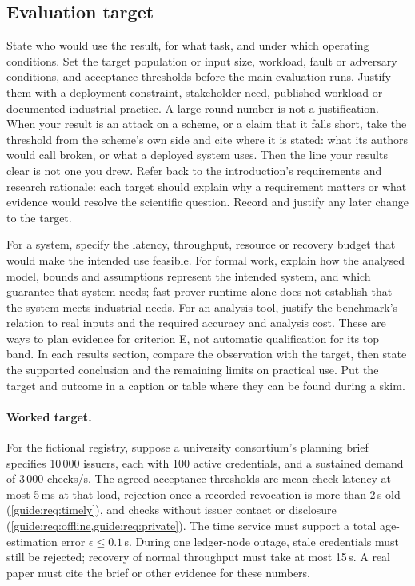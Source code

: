\subsection{Evaluation target}\label{guide:chapters:eval-target}
State who would use the result, for what task, and under which operating conditions. Set the target population or input size, workload, fault or adversary conditions, and acceptance thresholds before the main evaluation runs. Justify them with a deployment constraint, stakeholder need, published workload or documented industrial practice. A large round number is not a justification. When your result is an attack on a scheme, or a claim that it falls short, take the threshold from the scheme's own side and cite where it is stated: what its authors would call broken, or what a deployed system uses. Then the line your results clear is not one you drew. Refer back to the introduction's requirements and research rationale: each target should explain why a requirement matters or what evidence would resolve the scientific question. Record and justify any later change to the target.

For a system, specify the latency, throughput, resource or recovery budget that would make the intended use feasible. For formal work, explain how the analysed model, bounds and assumptions represent the intended system, and which guarantee that system needs; fast prover runtime alone does not establish that the system meets industrial needs. For an analysis tool, justify the benchmark's relation to real inputs and the required accuracy and analysis cost. These are ways to plan evidence for criterion E, not automatic qualification for its top band. In each results section, compare the observation with the target, then state the supported conclusion and the remaining limits on practical use. Put the target and outcome in a caption or table where they can be found during a skim.

\paragraph{Worked target.} For the fictional registry, suppose a university consortium's planning brief specifies 10\,000 issuers, each with 100 active credentials, and a sustained demand of 3\,000 checks/s. The agreed acceptance thresholds are mean check latency at most 5\,ms at that load, rejection once a recorded revocation is more than 2\,s old (\cref{guide:req:timely}), and checks without issuer contact or disclosure (\cref{guide:req:offline,guide:req:private}). The time service must support a total age-estimation error $\epsilon\leq0.1$\,s. During one ledger-node outage, stale credentials must still be rejected; recovery of normal throughput must take at most 15\,s. A real paper must cite the brief or other evidence for these numbers.

